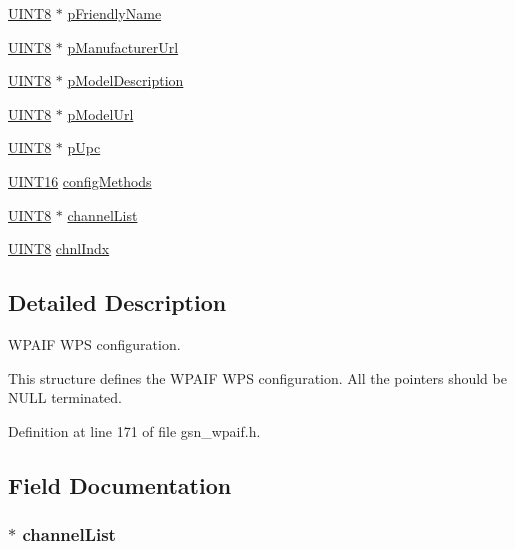 \begin{DoxyCompactItemize}
\hyperlink{a00660_gab27e9918b538ce9d8ca692479b375b6a}{UINT8} $\ast$ \hyperlink{a00427_a4e03d5ecd56303e62d97a9d17fecbef3}{pFriendlyName}
\item 
\hyperlink{a00660_gab27e9918b538ce9d8ca692479b375b6a}{UINT8} $\ast$ \hyperlink{a00427_ad8596c9cecbf3e023608c67be2595c94}{pManufacturerUrl}
\item 
\hyperlink{a00660_gab27e9918b538ce9d8ca692479b375b6a}{UINT8} $\ast$ \hyperlink{a00427_a1f151d37bd0ff988b2d3ffc6980be8d5}{pModelDescription}
\item 
\hyperlink{a00660_gab27e9918b538ce9d8ca692479b375b6a}{UINT8} $\ast$ \hyperlink{a00427_ae906a1a75e7b52847010abf2788dfb68}{pModelUrl}
\item 
\hyperlink{a00660_gab27e9918b538ce9d8ca692479b375b6a}{UINT8} $\ast$ \hyperlink{a00427_a785807e9bd8686cba78d8fee5df61863}{pUpc}
\item 
\hyperlink{a00660_ga09f1a1fb2293e33483cc8d44aefb1eb1}{UINT16} \hyperlink{a00427_a4f938b27a885def66901521b7fe7f539}{configMethods}
\item 
\hyperlink{a00660_gab27e9918b538ce9d8ca692479b375b6a}{UINT8} $\ast$ \hyperlink{a00427_a64a56e89ce52b9b98b17a57412603133}{channelList}
\item 
\hyperlink{a00660_gab27e9918b538ce9d8ca692479b375b6a}{UINT8} \hyperlink{a00427_a3ff94bef2c012a49993c3bdd94359710}{chnlIndx}
\end{DoxyCompactItemize}


\subsection{Detailed Description}
WPAIF WPS configuration. 

This structure defines the WPAIF WPS configuration. All the pointers should be NULL terminated. 

Definition at line 171 of file gsn\_\-wpaif.h.



\subsection{Field Documentation}
\hypertarget{a00427_a64a56e89ce52b9b98b17a57412603133}{
\subsubsection[{channelList}]{$\ast$ {\bf channelList}}}
\label{a00427_a64a56e89ce52b9b98b17a57412603133}


